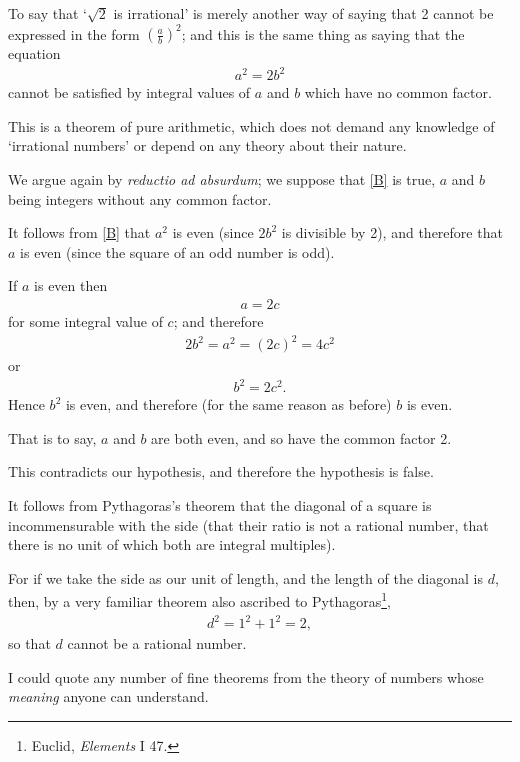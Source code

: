 \documentclass{article}
\numberwithin{equation}{section}
\begin{document}
To say that `$\sqrt{2}$ is irrational' is merely another way of saying that 2 cannot be expressed in the form $\left(\frac{a}{b}\right)^2$; and this is the same thing as saying that the equation
\begin{align}
    \label{B}
    \tag{B}
    a^2 = 2b^2
\end{align}
cannot be satisfied by integral values of $a$ and $b$ which have no common factor.

This is a theorem of pure arithmetic, which does not demand any knowledge of `irrational numbers' or depend on any theory about their nature.

%
We argue again by \textit{reductio ad absurdum}; we suppose that \eqref{B} is true, $a$ and $b$ being integers without any common factor.

It follows from \eqref{B} that $a^2$ is even (since $2b^2$ is divisible by 2), and therefore that $a$ is even (since the square of an odd number is odd).

If $a$ is even then
\begin{align}
    \label{C}
    \tag{C}
    a = 2c
\end{align}
for some integral value of $c$; and therefore
\begin{align*}
    2b^2 = a^2 = (2c)^2 = 4c^2
\end{align*}
or
\begin{align}
    \label{D}
    \tag{D}
    b^2 = 2c^2.
\end{align}
Hence $b^2$ is even, and therefore (for the same reason as before) $b$ is even.

That is to say, $a$ and $b$ are both even, and so have the common factor 2.

This contradicts our hypothesis, and therefore the hypothesis is false.

%
It follows from Pythagoras's theorem that the diagonal of a square is incommensurable with the side (that their ratio is not a rational number, that there is no unit of which both are integral multiples).

For if we take the side as our unit of length, and the length of the diagonal is $d$, then, by a very familiar theorem also ascribed to Pythagoras\footnote{Euclid, \textit{Elements} I 47.},
\begin{align*}
    d^2 = 1^2 + 1^2 = 2,
\end{align*}
so that $d$ cannot be a rational number.

%
I could quote any number of fine theorems from the theory of numbers whose \textit{meaning} anyone can understand.
\end{document}
